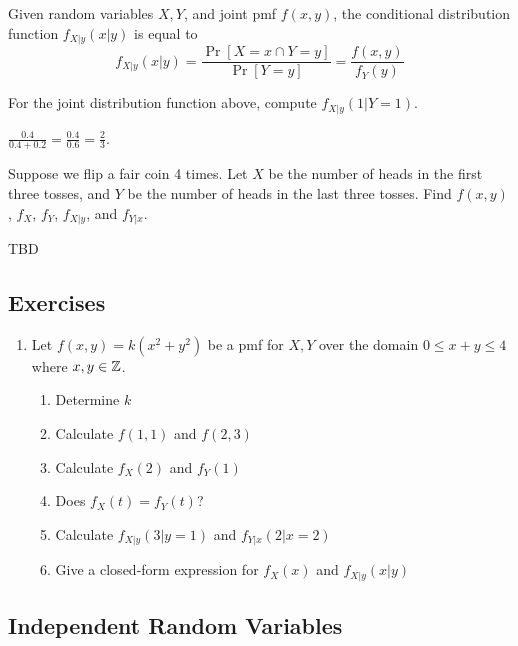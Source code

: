 \documentclass[../main.tex]{subfiles}
\begin{document}
\begin{definition}
Given random variables $X,Y$, and joint pmf $f(x,y)$, the conditional distribution function $f_{X|y}(x|y)$ is equal to 
\[
    f_{X|y}(x|y) = \frac{\Pr[X=x \cap Y=y]}{\Pr[Y=y]} = \frac{f(x,y)}{f_Y(y)}
\]
\end{definition}

\begin{example}
For the joint distribution function above, compute $f_{X|y}(1|Y=1)$.
\end{example}
\begin{solution}[Answer.]
$\frac{0.4}{0.4 + 0.2} = \frac{0.4}{0.6} = \frac{2}{3}$.
\end{solution}

\begin{example}
Suppose we flip a fair coin 4 times. Let $X$ be the number of heads in the first three tosses, and $Y$ be the number of heads in the last three tosses. Find $f(x,y)$, $f_X$, $f_Y$, $f_{X|y}$, and $f_{Y|x}$. 
\end{example}
\begin{solution}
	TBD
\end{solution}

\subsection{Exercises}
\begin{enumerate}
	\item Let $f(x,y) = k(x^2+y^2)$ be a pmf for $X,Y$ over the domain $0 \leq x + y \leq 4$
	where $x,y \in \mathbb{Z}$.
	\begin{enumerate}
		\item Determine $k$
		\item Calculate $f(1,1)$ and $f(2,3)$
		\item Calculate $f_X(2)$ and $f_Y(1)$
		\item Does $f_X(t) = f_Y(t)$?
		\item Calculate $f_{X|y}(3|y=1)$ and $f_{Y|x}(2|x=2)$
		\item Give a closed-form expression for $f_X(x)$ and $f_{X|y}(x|y)$
	\end{enumerate}
\end{enumerate}
\subsection{Independent Random Variables}
\end{document}
